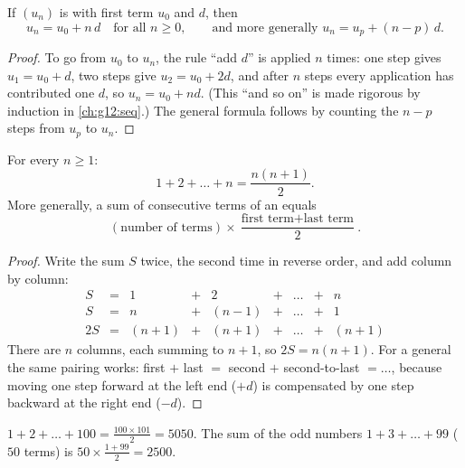 \begin{theorem}\label{thm:g11:seq:arithgeneral}
If $(u_n)$ is  with first term $u_0$ and  $d$,
then
\[
u_n = u_0 + n\,d \quad \text{for all } n \geq 0,
\qquad\text{and more generally } u_n = u_p + (n - p)\,d .
\]
\end{theorem}

\begin{proof}
To go from $u_0$ to $u_n$, the rule ``add $d$'' is applied $n$ times: one
step gives $u_1 = u_0 + d$, two steps give $u_2 = u_0 + 2d$, and after $n$
steps every application has contributed one $d$, so $u_n = u_0 + nd$.
(This ``and so on'' is made rigorous by induction in \cref{ch:g12:seq}.)
The general formula follows by counting the $n - p$ steps from $u_p$ to
$u_n$.
\end{proof}

\begin{theorem}\label{thm:g11:seq:intsum}
For every  $n \geq 1$:
\[
1 + 2 + \dots + n = \frac{n(n+1)}{2}.
\]
More generally, a sum of consecutive terms of an 
equals
\[
(\text{number of terms}) \times
\frac{\text{first term} + \text{last term}}{2}.
\]
\end{theorem}

\begin{proof}
Write the sum $S$ twice, the second time in reverse order, and add
column by column:
\[
\begin{array}{ccccccccc}
S & = & 1 & + & 2 & + & \dots & + & n\\
S & = & n & + & (n-1) & + & \dots & + & 1\\
\hline
2S & = & (n+1) & + & (n+1) & + & \dots & + & (n+1)
\end{array}
\]
There are $n$ columns, each summing to $n + 1$, so $2S = n(n+1)$. For a
general  the same pairing works: first $+$ last $=$
second $+$ second-to-last $= \dots$, because moving one step forward at
the left end ($+d$) is compensated by one step backward at the right end
($-d$).
\end{proof}

\begin{example}
$1 + 2 + \dots + 100 = \frac{100 \times 101}{2} = 5050$. The sum of the
odd numbers $1 + 3 + \dots + 99$ ($50$ terms) is
$50 \times \frac{1 + 99}{2} = 2500$.
\end{example}

